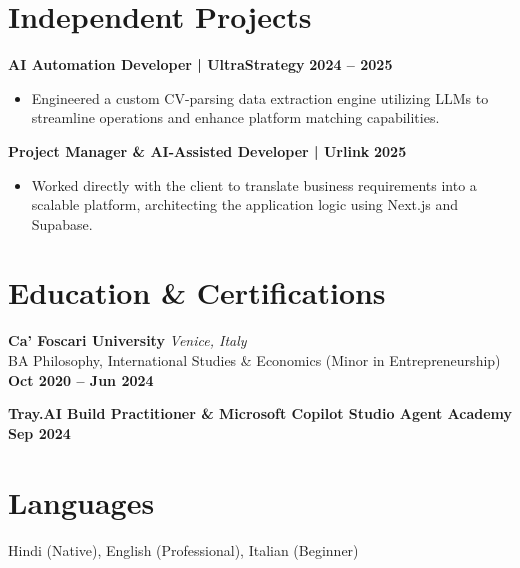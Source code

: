 \documentclass[11pt,a4paper]{article}
\begin{document}
\section*{Independent Projects}

\noindent \textbf{AI Automation Developer | UltraStrategy} \hfill \textbf{2024 -- 2025}
\begin{itemize}[leftmargin=*, noitemsep]
    \item Engineered a custom CV-parsing data extraction engine utilizing LLMs to streamline operations and enhance platform matching capabilities.
\end{itemize}
\vspace{6pt}

\noindent \textbf{Project Manager \& AI-Assisted Developer | Urlink} \hfill \textbf{2025}
\begin{itemize}[leftmargin=*, noitemsep]
    \item Worked directly with the client to translate business requirements into a scalable platform, architecting the application logic using Next.js and Supabase.
\end{itemize}

\section*{Education \& Certifications}
\noindent \textbf{Ca' Foscari University} \hfill \textit{Venice, Italy} \\
BA Philosophy, International Studies \& Economics (Minor in Entrepreneurship) \hfill \textbf{Oct 2020 -- Jun 2024}

\vspace{6pt}
\noindent \textbf{Tray.AI Build Practitioner \& Microsoft Copilot Studio Agent Academy} \hfill \textbf{Sep 2024}

\section*{Languages}
Hindi (Native), English (Professional), Italian (Beginner)
\end{document}

